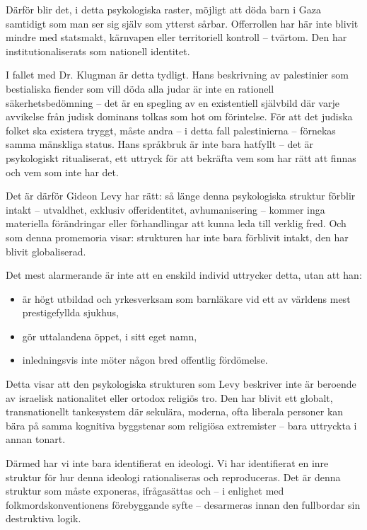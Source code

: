 \documentclass[12pt]{article}
\begin{document}
Därför blir det, i detta psykologiska raster, möjligt att döda barn i Gaza samtidigt som man ser sig själv som ytterst sårbar. Offerrollen har här inte blivit mindre med statsmakt, kärnvapen eller territoriell kontroll – tvärtom. Den har institutionaliserats som nationell identitet.

I fallet med Dr. Klugman är detta tydligt. Hans beskrivning av palestinier som bestialiska fiender som vill döda alla judar är inte en rationell säkerhetsbedömning – det är en spegling av en existentiell självbild där varje avvikelse från judisk dominans tolkas som hot om förintelse. För att det judiska folket ska existera tryggt, måste andra – i detta fall palestinierna – förnekas samma mänskliga status. Hans språkbruk är inte bara hatfyllt – det är psykologiskt ritualiserat, ett uttryck för att bekräfta vem som har rätt att finnas och vem som inte har det.

Det är därför Gideon Levy har rätt: så länge denna psykologiska struktur förblir intakt – utvaldhet, exklusiv offeridentitet, avhumanisering – kommer inga materiella förändringar eller förhandlingar att kunna leda till verklig fred. Och som denna promemoria visar: strukturen har inte bara förblivit intakt, den har blivit globaliserad.


Det mest alarmerande är inte att en enskild individ uttrycker detta, utan att han:
\begin{itemize}
    \item är högt utbildad och yrkesverksam som barnläkare vid ett av världens mest prestigefyllda sjukhus,
    \item gör uttalandena öppet, i sitt eget namn,
    \item inledningsvis inte möter någon bred offentlig fördömelse.
\end{itemize}

Detta visar att den psykologiska strukturen som Levy beskriver inte är beroende av israelisk nationalitet eller ortodox religiös tro. Den har blivit ett globalt, transnationellt tankesystem där sekulära, moderna, ofta liberala personer kan bära på samma kognitiva byggstenar som religiösa extremister – bara uttryckta i annan tonart.

Därmed har vi inte bara identifierat en ideologi. Vi har identifierat en inre struktur för hur denna ideologi rationaliseras och reproduceras. Det är denna struktur som måste exponeras, ifrågasättas och – i enlighet med folkmordskonventionens förebyggande syfte – desarmeras innan den fullbordar sin destruktiva logik.
\end{document}
